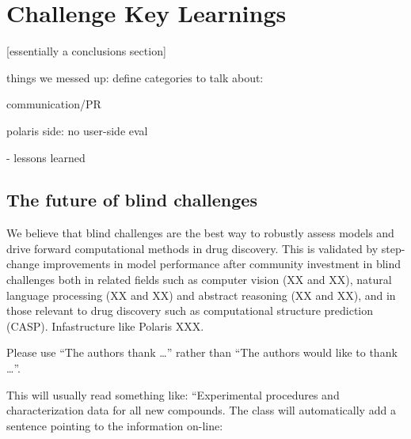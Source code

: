 \documentclass[journal=jacsat,manuscript=article]{achemso}
\begin{document}
\section{Challenge Key Learnings}
[essentially a conclusions section]


things we messed up:
define categories to talk about:

communication/PR


polaris side:
no user-side eval



- lessons learned


\subsection{The future of blind challenges}

We believe that blind challenges are the best way to robustly assess models and drive forward computational methods in drug discovery. This is validated by step-change improvements in model performance after community investment in blind challenges both in related fields such as computer vision (XX and XX), natural language processing (XX and XX) and abstract reasoning (XX and XX), and in those relevant to drug discovery such as computational structure prediction (CASP). Infastructure like Polaris XXX. 

















\begin{acknowledgement}

Please use ``The authors thank \ldots'' rather than ``The
authors would like to thank \ldots''.

\end{acknowledgement}

\begin{suppinfo}

This will usually read something like: ``Experimental procedures and
characterization data for all new compounds. The class will
automatically add a sentence pointing to the information on-line:

\end{suppinfo}
\end{document}
